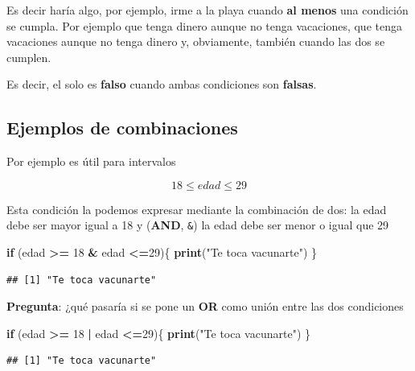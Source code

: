 \documentclass[
]{book}
\newenvironment{Shaded}{\begin{snugshade}}{\end{snugshade}}
\newcommand{\ControlFlowTok}[1]{\textcolor[rgb]{0.13,0.29,0.53}{\textbf{#1}}}
\newcommand{\DecValTok}[1]{\textcolor[rgb]{0.00,0.00,0.81}{#1}}
\newcommand{\FunctionTok}[1]{\textcolor[rgb]{0.13,0.29,0.53}{\textbf{#1}}}
\newcommand{\NormalTok}[1]{#1}
\newcommand{\SpecialCharTok}[1]{\textcolor[rgb]{0.81,0.36,0.00}{\textbf{#1}}}
\newcommand{\StringTok}[1]{\textcolor[rgb]{0.31,0.60,0.02}{#1}}
\begin{document}
Es decir haría algo, por ejemplo, irme a la playa cuando \textbf{al menos} una condición se cumpla. Por ejemplo que tenga dinero aunque no tenga vacaciones, que tenga vacaciones aunque no tenga dinero y, obviamente, también cuando las dos se cumplen.

Es decir, el \texttt{\textbar{}} solo es \textbf{falso} cuando ambas condiciones son \textbf{falsas}.

\subsection{Ejemplos de combinaciones}\label{ejemplos-de-combinaciones}

Por ejemplo es útil para intervalos

\[
18 \leq edad \leq 29 
\]

Esta condición la podemos expresar mediante la combinación de dos: la edad debe ser mayor igual a 18 y (\textbf{AND}, \texttt{\&}) la edad debe ser menor o igual que 29

\begin{Shaded}
\begin{Highlighting}[]
\ControlFlowTok{if}\NormalTok{ (edad }\SpecialCharTok{\textgreater{}=} \DecValTok{18} \SpecialCharTok{\&}\NormalTok{ edad }\SpecialCharTok{\textless{}=}\DecValTok{29}\NormalTok{)\{}
  \FunctionTok{print}\NormalTok{(}\StringTok{"Te toca vacunarte"}\NormalTok{)}
\NormalTok{\}}
\end{Highlighting}
\end{Shaded}

\begin{verbatim}
## [1] "Te toca vacunarte"
\end{verbatim}

\textbf{Pregunta}: ¿qué pasaría si se pone un \textbf{OR} como unión entre las dos condiciones

\begin{Shaded}
\begin{Highlighting}[]
\ControlFlowTok{if}\NormalTok{ (edad }\SpecialCharTok{\textgreater{}=} \DecValTok{18} \SpecialCharTok{|}\NormalTok{ edad }\SpecialCharTok{\textless{}=}\DecValTok{29}\NormalTok{)\{}
  \FunctionTok{print}\NormalTok{(}\StringTok{"Te toca vacunarte"}\NormalTok{)}
\NormalTok{\}}
\end{Highlighting}
\end{Shaded}

\begin{verbatim}
## [1] "Te toca vacunarte"
\end{verbatim}
\end{document}
